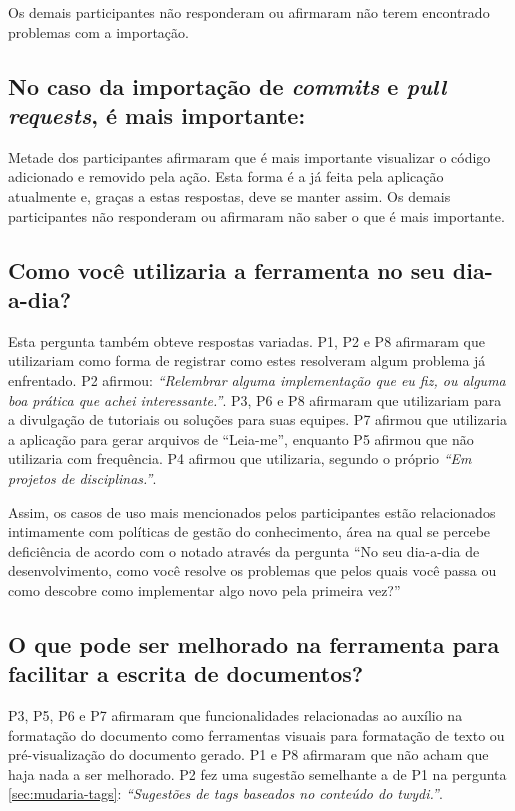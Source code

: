 Os demais participantes não responderam ou afirmaram não terem encontrado problemas com a importação.

\subsection{No caso da importação de \textit{commits} e \textit{pull requests}, é mais importante: }

Metade dos participantes afirmaram que é mais importante visualizar o código adicionado e removido pela ação. Esta forma é a já feita pela aplicação atualmente e, graças a estas respostas, deve se manter assim. Os demais participantes não responderam ou afirmaram não saber o que é mais importante.

\subsection{Como você utilizaria a ferramenta no seu dia-a-dia?}

Esta pergunta também obteve respostas variadas. P1, P2 e P8 afirmaram que utilizariam como forma de registrar como estes resolveram algum problema já enfrentado. P2 afirmou: \textit{``Relembrar alguma implementação que eu fiz, ou alguma boa prática que achei interessante.''}. P3, P6 e P8 afirmaram que utilizariam para a divulgação de tutoriais ou soluções para suas equipes. P7 afirmou que utilizaria a aplicação para gerar arquivos de ``Leia-me'', enquanto P5 afirmou que não utilizaria com frequência. P4 afirmou que utilizaria, segundo o próprio \textit{``Em projetos de disciplinas.''}.

Assim, os casos de uso mais mencionados pelos participantes estão relacionados intimamente com políticas de gestão do conhecimento, área na qual se percebe deficiência de acordo com o notado através da pergunta ``No seu dia-a-dia de desenvolvimento, como você resolve os problemas que pelos quais você passa ou como descobre como implementar algo novo pela primeira vez?''

\subsection{O que pode ser melhorado na ferramenta para facilitar a escrita de documentos?}

P3, P5, P6 e P7 afirmaram que funcionalidades relacionadas ao auxílio na formatação do documento como ferramentas visuais para formatação de texto ou pré-visualização do documento gerado. P1 e P8 afirmaram que não acham que haja nada a ser melhorado. P2 fez uma sugestão semelhante a de P1 na pergunta \ref{sec:mudaria-tags}: \textit{``Sugestões de tags baseados no conteúdo do twydi.''}.

